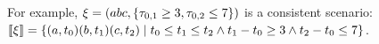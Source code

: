 For example, $\xi = (a b c, \{ \tau_{0,1} \geq
3, \tau_{0,2} \leq 7\})$ is a consistent scenario:
$\llbracket \xi \rrbracket =
\{(a,t_0)(b,t_1)(c,t_2)\;|\;t_0 \leq t_1 \leq t_2
  \wedge t_1 - t_0 \geq 3
  \wedge t_2 - t_0 \leq 7\}$.

